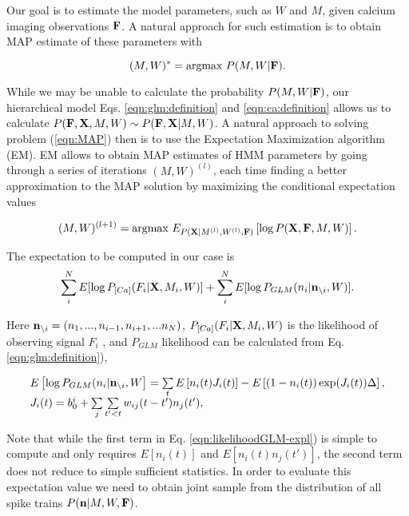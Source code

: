 Our goal is to estimate the model parameters, such as $W$ and $M$, given calcium imaging observations ${\bf F}$. A natural approach for such estimation is to obtain MAP estimate of these parameters with

\begin{equation}\label{eqn:MAP}
(M, W)^*=\text{argmax } P(M, W|{\bf F}).
\end{equation}

While we may be unable to calculate the probability $P(M, W|{\bf F})$, our hierarchical model Eqs. \eqref{eqn:glm:definition} and \eqref{eqn:ca:definition} allows us to calculate $P({\bf F}, {\bf X}, M, W)\sim P({\bf F}, {\bf X}|M, W)$. A natural approach to solving problem (\ref{eqn:MAP}) then is to use the Expectation Maximization algorithm (EM).  EM allows to obtain MAP estimates of HMM parameters by going through a series of iterations $(M, W)^{(l)}$, each time finding a better approximation to the MAP solution by maximizing the conditional expectation values

\begin{equation}
(M, W)^{(l+1)}=\text{argmax }E_{P({\bf X}|M^{(l)}, W^{(l)}, {\bf F})}\left[\log P({\bf X}, {\bf F}, M, W)\right].
\end{equation}

The expectation to be computed in our case is
\begin{equation}\label{eqn:loglik:definition-expl}
\sum_i^N E[\log P_{[Ca]}(F_i|{\bf X}, M_i, W)] + \sum_i^N E[\log P_{GLM}(n_i|{\bf n}_{\backslash i}, W)].
\end{equation}

Here ${\bf n}_{\backslash i}=(n_1, ..., n_{i-1}, n_{i+1}, ...n_N)$, $P_{[Ca]}(F_i|{\bf X}, M_i, W)$ is the likelihood of observing signal $F_i$ \cite{Vogelstein2009}, and $P_{GLM}$ likelihood can be calculated from Eq. \eqref{eqn:glm:definition}), 

\begin{equation}\label{eqn:likelihoodGLM-expl}
\begin{array}{l}
E\left[\log P_{GLM}(n_i|{\bf n}_{\backslash i}, W\right]=\sum\limits_t E \left[ n_i(t) J_i(t)\right] - E\left[(1-n_i(t)) \exp(J_i(t)) \Delta \right], \\
J_i(t)=b_0^i+\sum\limits_{j} \sum\limits_{t'<t} w_{ij}(t-t')n_{j}(t'), 
\end{array}
\end{equation}

Note that while the first term in Eq. \eqref{eqn:likelihoodGLM-expl}) is simple to compute and only requires $E[n_i(t)]$ and $E[n_i(t) n_{j}(t')]$, the second term does not reduce to simple sufficient statistics. In order to evaluate this expectation value we need to obtain joint sample from the distribution of all spike trains $P({\bf n}|M, W, {\bf F})$.

